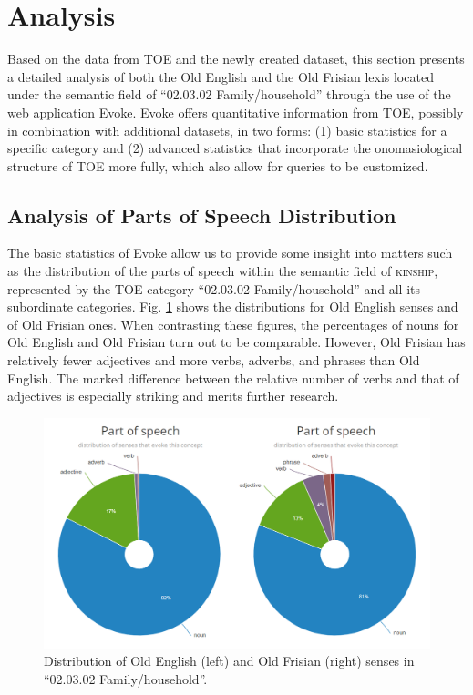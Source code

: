 \section{Analysis}
\label{sect:Stolk2021b:Analysis}

Based on the data from TOE and the newly created dataset, this section presents a detailed analysis of both the Old English and the Old Frisian lexis located under the semantic field of “02.03.02 Family/household” through the use of the web application Evoke. Evoke offers quantitative information from TOE, possibly in combination with additional datasets, in two forms: (1) basic statistics for a specific category and (2) advanced statistics that incorporate the onomasiological structure of TOE more fully, which also allow for queries to be customized. 

\subsection{Analysis of Parts of Speech Distribution}
The basic statistics of Evoke allow us to provide some insight into matters such as the distribution of the parts of speech within the semantic field of \textsc{kinship}, represented by the TOE category “02.03.02 Family/household” and all its subordinate categories. Fig. \ref{fig:Stolk2021b:Fig5} shows the distributions for Old English senses and of Old Frisian ones. When contrasting these figures, the percentages of nouns for Old English and Old Frisian turn out to be comparable. However, Old Frisian has relatively fewer adjectives and more verbs, adverbs, and phrases than Old English. The marked difference between the relative number of verbs and that of adjectives is especially striking and merits further research.

\begin{figure}[htbp]
	\includegraphics[width=\textwidth]{Stolk2021b/fig/Fig5.png}
	\caption[]{\label{fig:Stolk2021b:Fig5} Distribution of Old English (left) and Old Frisian (right) senses in “02.03.02 Family/household”.}
\end{figure}


